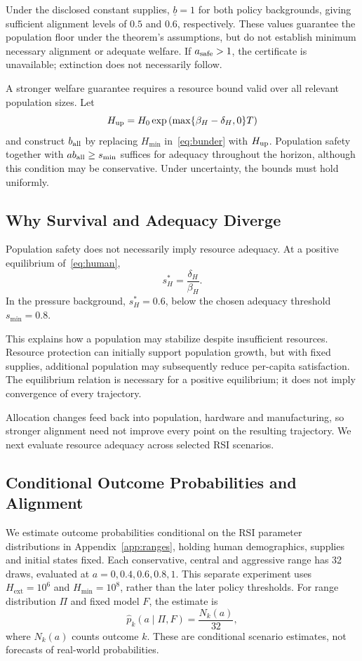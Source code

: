 \documentclass[12pt,a4paper]{article}
\theoremstyle{remark}
\newcommand{\Hext}{H_{\mathrm{ext}}}
\newcommand{\Hmin}{H_{\min}}
\begin{document}
Under the disclosed constant supplies, $\underline b=1$ for both policy backgrounds, giving sufficient alignment levels of $0.5$ and $0.6$, respectively. These values guarantee the population floor under the theorem's assumptions, but do not establish minimum necessary alignment or adequate welfare. If $a_{\rm safe}>1$, the certificate is unavailable; extinction does not necessarily follow.

A stronger welfare guarantee requires a resource bound valid over all relevant population sizes. Let
\[
H_{\rm up}=H_0\exp\left(\max\{\beta_H-\delta_H,0\}T\right)
\]
and construct $b_{\rm all}$ by replacing $\Hmin$ in~\eqref{eq:bunder} with $H_{\rm up}$. Population safety together with $ab_{\rm all}\ge s_{\min}$ suffices for adequacy throughout the horizon, although this condition may be conservative. Under uncertainty, the bounds must hold uniformly.


\subsection{Why Survival and Adequacy Diverge}

Population safety does not necessarily imply resource adequacy. At a positive equilibrium of~\eqref{eq:human},
\[
s_H^*=\frac{\delta_H}{\beta_H}.
\]
In the pressure background, $s_H^*=0.6$, below the chosen adequacy threshold $s_{\min}=0.8$.

This explains how a population may stabilize despite insufficient resources. Resource protection can initially support population growth, but with fixed supplies, additional population may subsequently reduce per-capita satisfaction. The equilibrium relation is necessary for a positive equilibrium; it does not imply convergence of every trajectory.

Allocation changes feed back into population, hardware and manufacturing, so stronger alignment need not improve every point on the resulting trajectory. We next evaluate resource adequacy across selected RSI scenarios.

\subsection{Conditional Outcome Probabilities and Alignment}

We estimate outcome probabilities conditional on the RSI parameter distributions in Appendix~\ref{app:ranges}, holding human demographics, supplies and initial states fixed. Each conservative, central and aggressive range has 32 draws, evaluated at $a=0,0.4,0.6,0.8,1$. This separate experiment uses $\Hext=10^6$ and $\Hmin=10^8$, rather than the later policy thresholds. For range distribution $\Pi$ and fixed model $F$, the estimate is
\[
\widehat p_k(a\mid\Pi,F)=\frac{N_k(a)}{32},
\]
where $N_k(a)$ counts outcome $k$. These are conditional scenario estimates, not forecasts of real-world probabilities.
\end{document}
